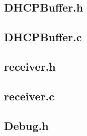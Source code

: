 \documentclass[11pt,a4paper]{scrartcl}
\begin{document}
\subsection{DHCPBuffer.h}


\subsection{DHCPBuffer.c}


\subsection{receiver.h}


\subsection{receiver.c}


\subsection{Debug.h}

\end{document}
